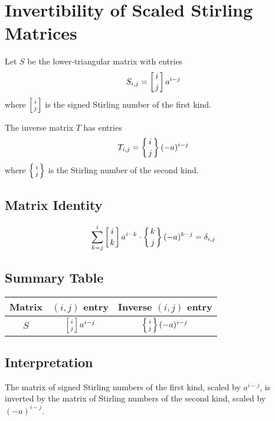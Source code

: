 \documentclass{article}
\begin{document}
\section*{Invertibility of Scaled Stirling Matrices}

Let $S$ be the lower-triangular matrix with entries
\[
S_{i,j} = \left[ i \atop j \right] a^{i-j}
\]
where $\left[ i \atop j \right]$ is the signed Stirling number of the first kind.

The inverse matrix $T$ has entries
\[
T_{i,j} = \left\{ i \atop j \right\} (-a)^{i-j}
\]
where $\left\{ i \atop j \right\}$ is the Stirling number of the second kind.

\subsection*{Matrix Identity}
\[
\sum_{k=j}^i \left[ i \atop k \right] a^{i-k} \cdot \left\{ k \atop j \right\} (-a)^{k-j} = \delta_{i,j}
\]

\subsection*{Summary Table}
\begin{tabular}{|c|c|c|}
\hline
Matrix & $(i,j)$ entry & Inverse $(i,j)$ entry \\
\hline
$S$ & $\left[ i \atop j \right] a^{i-j}$ & $\left\{ i \atop j \right\} (-a)^{i-j}$ \\
\hline
\end{tabular}

\subsection*{Interpretation}

The matrix of signed Stirling numbers of the first kind, scaled by $a^{i-j}$, is inverted by the matrix of Stirling numbers of the second kind, scaled by $(-a)^{i-j}$.
\end{document}
